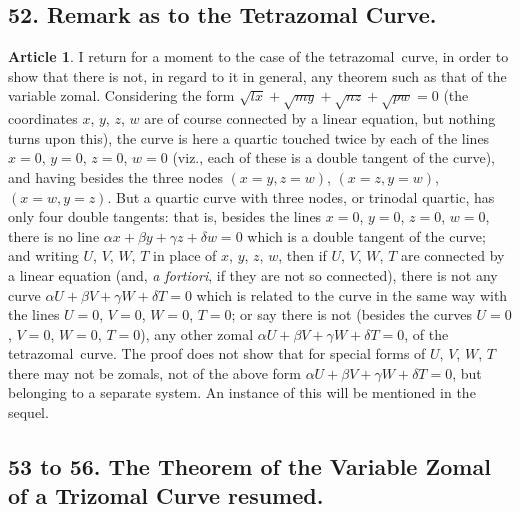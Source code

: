 \documentclass[11pt,a4paper]{article}
\theoremstyle{definition}
\newtheorem{art}{Article}
\newcommand{\tetrazomal}{tetrazomal}
\begin{document}
\subsection*{52. Remark as to the Tetrazomal Curve.}

\begin{art}
I return for a moment to the case of the \tetrazomal\ curve, in order to show that there is not, in regard to it in general, any theorem such as that of the variable zomal. Considering the form $\sqrt{lx} + \sqrt{my} + \sqrt{nz} + \sqrt{pw} = 0$ (the coordinates $x$, $y$, $z$, $w$ are of course connected by a linear equation, but nothing turns upon this), the curve is here a quartic touched twice by each of the lines $x = 0$, $y = 0$, $z = 0$, $w = 0$ (viz., each of these is a double tangent of the curve), and having besides the three nodes $(x = y, z = w)$, $(x = z, y = w)$, $(x = w, y = z)$. But a quartic curve with three nodes, or trinodal quartic, has only four double tangents: that is, besides the lines $x = 0$, $y = 0$, $z = 0$, $w = 0$, there is no line $\alpha x + \beta y + \gamma z + \delta w = 0$ which is a double tangent of the curve; and writing $U$, $V$, $W$, $T$ in place of $x$, $y$, $z$, $w$, then if $U$, $V$, $W$, $T$ are connected by a linear equation (and, \textit{a fortiori}, if they are not so connected), there is not any curve $\alpha U + \beta V + \gamma W + \delta T = 0$ which is related to the curve in the same way with the lines $U = 0$, $V = 0$, $W = 0$, $T = 0$; or say there is not (besides the curves $U = 0$, $V = 0$, $W = 0$, $T = 0$), any other zomal $\alpha U + \beta V + \gamma W + \delta T = 0$, of the \tetrazomal\ curve. The proof does not show that for special forms of $U$, $V$, $W$, $T$ there may not be zomals, not of the above form $\alpha U + \beta V + \gamma W + \delta T = 0$, but belonging to a separate system. An instance of this will be mentioned in the sequel.
\end{art}



\subsection*{53 to 56. The Theorem of the Variable Zomal of a Trizomal Curve resumed.}
\end{document}
